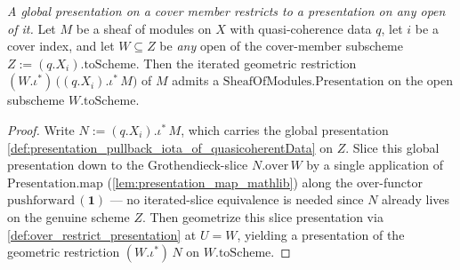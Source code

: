 \begin{definition}

  \label{def:presentation_pullback_iota_restrict}
  \textit{A global presentation on a cover member restricts to a presentation on any open of it.}
  Let \(M\) be a sheaf of modules on \(X\) with quasi-coherence data \(q\), let \(i\) be a cover
  index, and let \(W \subseteq Z\) be \emph{any} open of the cover-member subscheme
  \(Z := (q.X_i).\mathrm{toScheme}\). Then the iterated geometric restriction
  \((W.\iota^{*})\,\bigl((q.X_i).\iota^{*}\,M\bigr)\) of \(M\) admits a
  \(\mathrm{SheafOfModules.Presentation}\) on the open subscheme \(W.\mathrm{toScheme}\).
\end{definition}
\begin{proof}
  Write \(N := (q.X_i).\iota^{*}\,M\), which carries the global presentation
  \cref{def:presentation_pullback_iota_of_quasicoherentData} on \(Z\). Slice this global presentation
  down to the Grothendieck-slice \(N.\mathrm{over}\,W\) by a single application of
  \(\mathrm{Presentation.map}\) (\cref{lem:presentation_map_mathlib}) along the over-functor
  \(\mathrm{pushforward}\,(\mathbf{1})\) — no iterated-slice equivalence is needed since \(N\) already
  lives on the genuine scheme \(Z\). Then geometrize this slice presentation via
  \cref{def:over_restrict_presentation} at \(U = W\), yielding a presentation of the geometric
  restriction \((W.\iota^{*})\,N\) on \(W.\mathrm{toScheme}\).
\end{proof}

